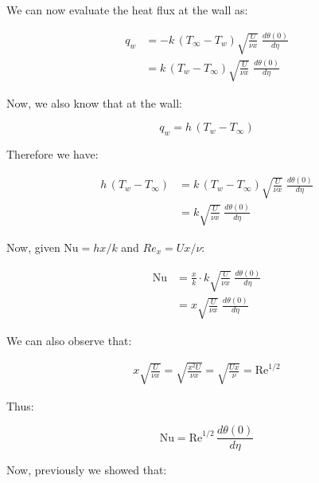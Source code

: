 \documentclass[letterpaper,12pt]{article}
\begin{document}
We can now evaluate the heat flux at the wall as:

\begin{equation}
\begin{aligned}
    q_w &= -k\,(T_\infty-T_w)\sqrt{\frac{U}{\nu x}}\;\frac{d\theta(0)}{d\eta} \\
        &= k\,(T_w-T_\infty)\sqrt{\frac{U}{\nu x}}\;\frac{d\theta(0)}{d\eta}
\end{aligned}
\end{equation}

Now, we also know that at the wall:

\begin{equation}
    q_w=h\,(T_w-T_\infty)
\end{equation}

Therefore we have:

\begin{equation}
\begin{aligned}
    h\,(T_w-T_\infty) &= k\,(T_w-T_\infty)\sqrt{\frac{U}{\nu x}}\;\frac{d\theta(0)}{d\eta} \\
                      &= k\sqrt{\frac{U}{\nu x}}\;\frac{d\theta(0)}{d\eta}
\end{aligned}
\end{equation}

Now, given $\text{Nu}=hx/k$ and $Re_x=Ux/\nu$:

\begin{equation}
\begin{aligned}
    \text{Nu} &= \frac{x}{k}\cdot k\sqrt{\frac{U}{\nu x}}\;\frac{d\theta(0)}{d\eta} \\
              &= x\sqrt{\frac{U}{\nu x}}\;\frac{d\theta(0)}{d\eta}
\end{aligned}
\end{equation}

We can also observe that:

\begin{equation}
\begin{aligned}
    x\sqrt{\frac{U}{\nu x}}=\sqrt{\frac{x^2U}{\nu x}}=\sqrt{\frac{Ux}{\nu}}=\text{Re}^{1/2}
\end{aligned}
\end{equation}

Thus:

\begin{equation}
    \text{Nu}=\text{Re}^{1/2}\,\frac{d\theta(0)}{d\eta}
\end{equation}

Now, previously we showed that:
\end{document}
